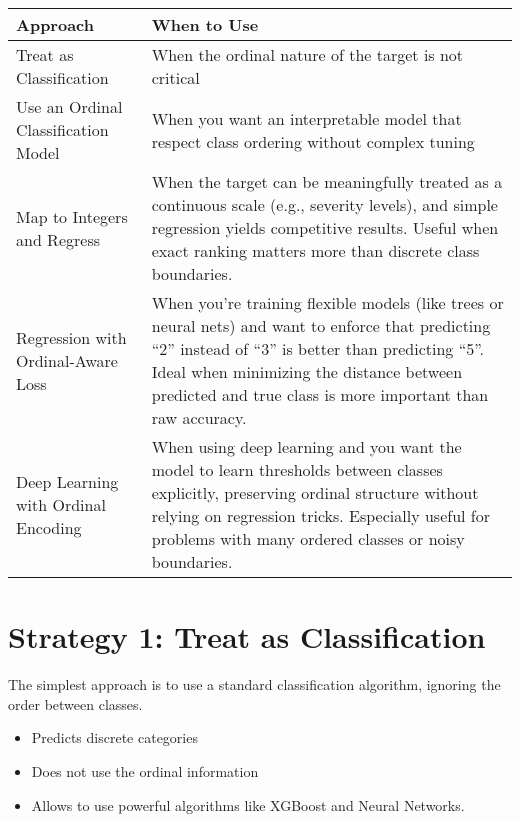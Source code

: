 \documentclass[12pt,openany]{book}
\begin{document}
\begin{minipage}{\textwidth}
\begin{center}
\renewcommand{\arraystretch}{1.5} %
\begin{tabular}{lp{9cm}}
\toprule
\textbf{Approach} & \textbf{When to Use} \\
\midrule
Treat as Classification & When the ordinal nature of the target is not critical \\
Use an Ordinal Classification Model & When you want an interpretable model that respect class ordering without complex tuning \\
Map to Integers and Regress & When the target can be meaningfully treated as a continuous scale (e.g., severity levels), and simple regression yields competitive results. Useful when exact ranking matters more than discrete class boundaries. \\
Regression with Ordinal-Aware Loss & When you're training flexible models (like trees or neural nets) and want to enforce that predicting “2” instead of “3” is better than predicting “5”. Ideal when minimizing the distance between predicted and true class is more important than raw accuracy. \\
Deep Learning with Ordinal Encoding & When using deep learning and you want the model to learn thresholds between classes explicitly, preserving ordinal structure without relying on regression tricks. Especially useful for problems with many ordered classes or noisy boundaries. \\
\bottomrule
\end{tabular}
\end{center}
\end{minipage}

\vspace{10pt}

\section{Strategy 1: Treat as Classification}

The simplest approach is to use a standard classification algorithm, ignoring
the order between classes.

\begin{itemize}
    \item Predicts discrete categories
    \item Does not use the ordinal information
    \item Allows to use powerful algorithms like XGBoost and Neural Networks.
\end{itemize}
\end{document}
